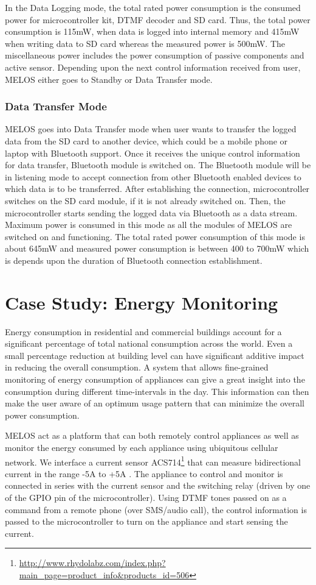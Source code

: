 \documentclass[10pt]{sigplan-proc-varsize}
\newcommand{\melos}{MELOS }
\begin{document}
In the Data Logging mode, the total rated power consumption is the consumed power for microcontroller kit, DTMF decoder and SD card. Thus, the total power consumption is 115mW, when data is logged into internal memory and 415mW when writing data to SD card whereas the measured power is 500mW. The miscellaneous power includes the power consumption of passive components and active sensor. Depending upon the next control information received from user, \melos either goes to Standby or Data Transfer mode.

\subsubsection{Data Transfer Mode}
\melos goes into Data Transfer mode when user wants to transfer the logged data from the SD card to another device, which could be a mobile phone or laptop with Bluetooth support. Once it receives the unique control information for data transfer, Bluetooth module is switched on. The Bluetooth module will be in listening mode to accept connection from other Bluetooth enabled devices to which data is to be transferred. After establishing the connection, microcontroller switches on the SD card module, if it is not already switched on. Then, the microcontroller starts sending the logged data via Bluetooth as a data stream. Maximum power is consumed in this mode as all the modules of \melos are switched on and functioning. The total rated power consumption of this mode is about 645mW and measured power consumption is between 400 to 700mW which is depends upon the duration of  Bluetooth connection establishment.

\section{Case Study: Energy Monitoring}
\label{sec:case}
Energy consumption in residential and commercial buildings account for a significant percentage of total national consumption across the world.  Even a small percentage reduction at building level can have significant additive impact in reducing the overall consumption. A system that allows fine-grained monitoring of energy consumption of appliances can give a great insight into the consumption during different time-intervals in the day. This information can then make the user aware of an optimum usage pattern that can minimize the overall power consumption.

\melos act as a platform that can both remotely control appliances as well as monitor the energy consumed by each appliance using ubiquitous cellular network. We interface a current sensor ACS714\footnote{\url{http://www.rhydolabz.com/index.php?main_page=product_info&products_id=506}} that can  measure bidirectional current in the range -5A to +5A . The appliance to control and monitor is connected in series with the current sensor and the switching relay (driven by one of the GPIO pin of the microcontroller). Using DTMF tones passed on as a command from a remote phone (over SMS/audio call), the control information is passed to the microcontroller to turn on the appliance and start sensing the current.
\end{document}
